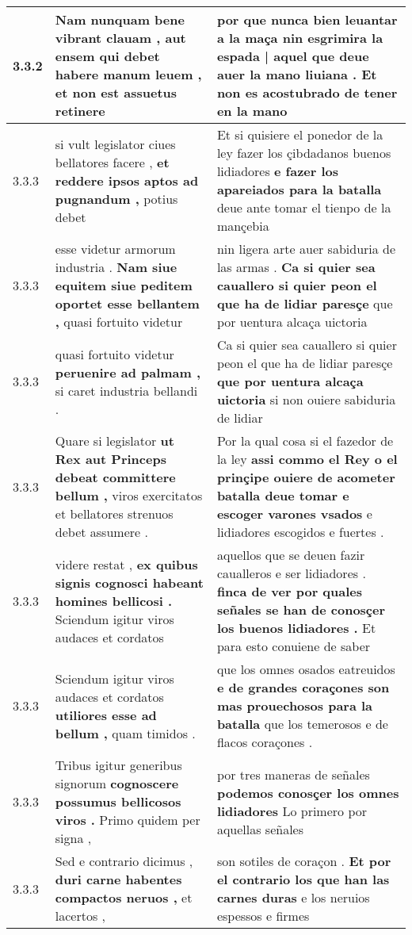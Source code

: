 \begin{tabular}{|p{1cm}|p{6.5cm}|p{6.5cm}|}
3.3.2 & Nam nunquam bene vibrant clauam , \textbf{ aut ensem qui debet habere manum leuem , } et non est assuetus retinere & por que nunca bien leuantar a la maça \textbf{ nin esgrimira la espada | aquel que deue auer la mano liuiana . } Et non es acostubrado de tener en la mano \\\hline
3.3.3 & si vult legislator ciues bellatores facere , \textbf{ et reddere ipsos aptos ad pugnandum , } potius debet & Et si quisiere el ponedor de la ley fazer los çibdadanos buenos lidiadores \textbf{ e fazer los apareiados para la batalla } deue ante tomar el tienpo de la mançebia \\\hline
3.3.3 & esse videtur armorum industria . \textbf{ Nam siue equitem siue peditem oportet esse bellantem , } quasi fortuito videtur & nin ligera arte auer sabiduria de las armas . \textbf{ Ca si quier sea cauallero si quier peon el que ha de lidiar paresçe } que por uentura alcaça uictoria \\\hline
3.3.3 & quasi fortuito videtur \textbf{ peruenire ad palmam , } si caret industria bellandi . & Ca si quier sea cauallero si quier peon el que ha de lidiar paresçe \textbf{ que por uentura alcaça uictoria } si non ouiere sabiduria de lidiar \\\hline
3.3.3 & Quare si legislator \textbf{ ut Rex aut Princeps debeat committere bellum , } viros exercitatos et bellatores strenuos debet assumere . & Por la qual cosa si el fazedor de la ley \textbf{ assi commo el Rey o el prinçipe ouiere de acometer batalla deue tomar e escoger varones vsados } e lidiadores escogidos e fuertes . \\\hline
3.3.3 & videre restat , \textbf{ ex quibus signis cognosci habeant homines bellicosi . } Sciendum igitur viros audaces et cordatos & aquellos que se deuen fazir caualleros e ser lidiadores . \textbf{ finca de ver por quales señales se han de conosçer los buenos lidiadores . } Et para esto conuiene de saber \\\hline
3.3.3 & Sciendum igitur viros audaces et cordatos \textbf{ utiliores esse ad bellum , } quam timidos . & que los omnes osados eatreuidos \textbf{ e de grandes coraçones son mas prouechosos para la batalla } que los temerosos e de flacos coraçones . \\\hline
3.3.3 & Tribus igitur generibus signorum \textbf{ cognoscere possumus bellicosos viros . } Primo quidem per signa , & por tres maneras de señales \textbf{ podemos conosçer los omnes lidiadores } Lo primero por aquellas señales \\\hline
3.3.3 & Sed e contrario dicimus , \textbf{ duri carne habentes compactos neruos , } et lacertos , & son sotiles de coraçon . \textbf{ Et por el contrario los que han las carnes duras } e los neruios espessos e firmes \\\hline

\end{tabular}
